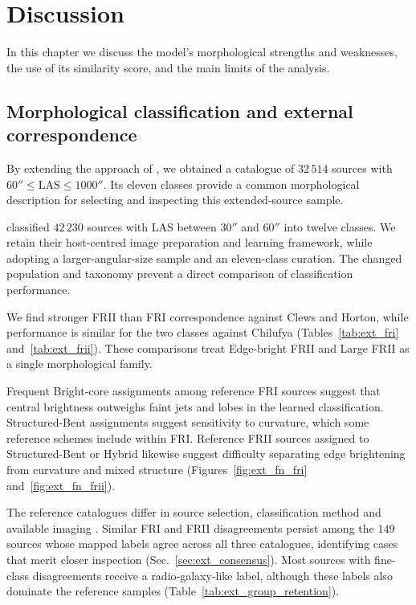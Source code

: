 \section{Discussion}
\label{sec:discussion}

In this chapter we discuss the model's morphological strengths and weaknesses, the use of its similarity score, and the main limits of the analysis.

\subsection{Morphological classification and external correspondence}
\label{sec:discussion_catalogue}
\label{sec:discussion_external}

By extending the approach of \citet{Nicolas2025}, we obtained a catalogue of \(32\,514\) sources with \(60''\leq\mathrm{LAS}\leq1000''\). Its eleven classes provide a common morphological description for selecting and inspecting this extended-source sample.

\citet{Nicolas2025} classified \(42\,230\) sources with LAS between \(30''\) and \(60''\) into twelve classes. We retain their host-centred image preparation and learning framework, while adopting a larger-angular-size sample and an eleven-class curation. The changed population and taxonomy prevent a direct comparison of classification performance.

We find stronger FRII than FRI correspondence against Clews and Horton, while performance is similar for the two classes against Chilufya (Tables~\ref{tab:ext_fri} and~\ref{tab:ext_frii}). These comparisons treat Edge-bright FRII and Large FRII as a single morphological family.

Frequent Bright-core assignments among reference FRI sources suggest that central brightness outweighs faint jets and lobes in the learned classification. Structured-Bent assignments suggest sensitivity to curvature, which some reference schemes include within FRI. Reference FRII sources assigned to Structured-Bent or Hybrid likewise suggest difficulty separating edge brightening from curvature and mixed structure (Figures~\ref{fig:ext_fn_fri} and~\ref{fig:ext_fn_frii}). 

The reference catalogues differ in source selection, classification method and available imaging \citep{Clews2025,Horton2025,Chilufya2025}. Similar FRI and FRII disagreements persist among the \(149\) sources whose mapped labels agree across all three catalogues, identifying cases that merit closer inspection (Sec.~\ref{sec:ext_consensus}). Most sources with fine-class disagreements receive a radio-galaxy-like label, although these labels also dominate the reference samples (Table~\ref{tab:ext_group_retention}).

